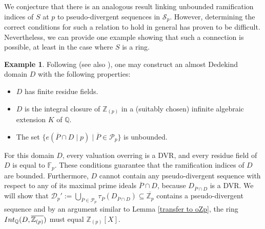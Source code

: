 \documentclass{article}
\theoremstyle{definition}\newtheorem{Def}[equation]{Definition}
\newtheorem{Ex}[equation]{Example}
\theoremstyle{definition}\newtheorem{Ques}[equation]{Question}
\theoremstyle{definition}\newtheorem{Conj}[equation]{Conjecture}
\theoremstyle{definition}\newtheorem{Not}[equation]{Notation}
\newcommand{\Q}{\mathbb{Q}}
\newcommand{\F}{\mathbb{F}}
\newcommand{\oP}{\overline{P}}
\newcommand{\Z}{\mathbb{Z}}
\newcommand{\oZp}{\overline{\Z_p}}
\newcommand{\Int}{\textnormal{Int}}
\newcommand{\IntQ}{\Int_{\Q}}
\numberwithin{equation}{section}
\begin{document}
We conjecture that there is an analogous result linking unbounded ramification indices of $S$ at $p$ to pseudo-divergent sequences in $\mathcal{S}_p$. However, determining the correct conditions for such a relation to hold in general has proven to be difficult. Nevertheless, we can provide one example showing that such a connection is possible, at least in the case where $S$ is a ring.

\begin{Ex}\label{Chabert example}
Following \cite[Example 6.2]{ChabEx} (see also \cite[Example VI.4.17]{CaCh}), one may construct an almost Dedekind domain $D$ with the following properties:
\begin{itemize}
\item $D$ has finite residue fields.
\item $D$ is the integral closure of $\Z_{(p)}$ in a (suitably chosen) infinite algebraic extension $K$ of $\Q$.
\item The set $\{e(\oP\cap D\mid p)\mid \oP\in\mathcal{P}_p\}$ is unbounded.
\end{itemize}
For this domain $D$, every valuation overring is a DVR, and every residue field of $D$ is equal to $\F_p$. These conditions guarantee that the ramification indices of $D$ are bounded. Furthermore, $D$ cannot contain any pseudo-divergent sequence with respect to any of its maximal prime ideals $\oP\cap D$, because $D_{\oP\cap D}$ is a DVR. We will show that $\mathcal{D}_p':=\bigcup_{\oP\in\mathcal{P}_p}\tau_{\oP}(D_{\oP\cap D})\subseteq\oZp$ contains a pseudo-divergent sequence and by an argument similar to Lemma \ref{transfer to oZp}, the ring $\IntQ(D,\overline{\Z_{(p)}})$ must equal $\Z_{(p)}[X]$.
\end{Ex}
\end{document}

